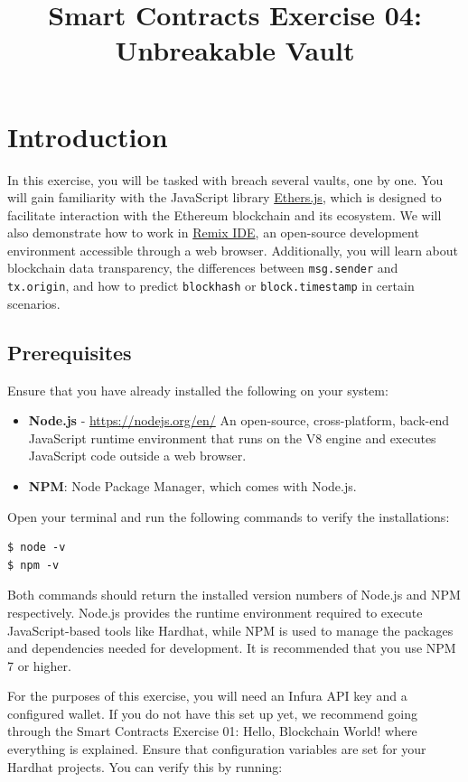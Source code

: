 \documentclass[12pt]{article}
\title{Smart Contracts Exercise 04: \\ Unbreakable Vault}
\author{}
\date{}
\begin{document}
\maketitle
\section{Introduction}
In this exercise, you will be tasked with breach several vaults, one by one. You will gain familiarity with the JavaScript library \href{https://docs.ethers.org/v6}{Ethers.js}, which is designed to facilitate interaction with the Ethereum blockchain and its ecosystem. We will also demonstrate how to work in \href{https://remix.ethereum.org/}{Remix IDE}, an open-source development environment accessible through a web browser. Additionally, you will learn about blockchain data transparency, the differences between \texttt{msg.sender} and \texttt{tx.origin}, and how to predict \texttt{blockhash} or \texttt{block.timestamp} in certain scenarios.

\subsection*{Prerequisites}

Ensure that you have already installed the following on your system:

\begin{itemize}
    \item \textbf{Node.js} - \url{https://nodejs.org/en/}
    An open-source, cross-platform, back-end JavaScript runtime environment that runs on the V8 engine and executes JavaScript code outside a web browser. 
    \item \textbf{NPM}: Node Package Manager, which comes with Node.js.
\end{itemize}

Open your terminal and run the following commands to verify the installations:

\begin{verbatim}
$ node -v
$ npm -v
\end{verbatim}

Both commands should return the installed version numbers of Node.js and NPM respectively. Node.js provides the runtime environment required to execute JavaScript-based tools like Hardhat, while NPM is used to manage the packages and dependencies needed for development. It is recommended that you use NPM 7 or higher.

For the purposes of this exercise, you will need an Infura API key and a configured wallet. If you do not have this set up yet, we recommend going through the Smart Contracts Exercise 01: Hello, Blockchain World! where everything is explained. Ensure that configuration variables are set for your Hardhat projects. You can verify this by running:
\end{document}
